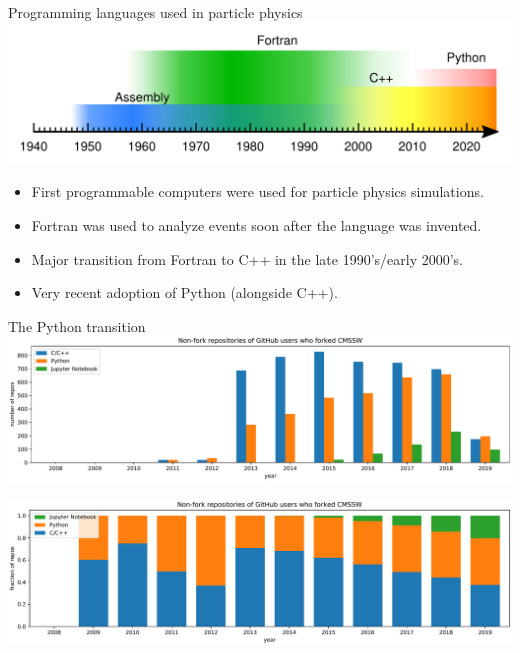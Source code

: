\documentclass[aspectratio=169]{beamer}
\begin{document}
\begin{frame}{Programming languages used in particle physics}
\large
\vspace{0.5 cm}
\includegraphics[width=\linewidth]{programming-languages.pdf}

\vspace{0.25 cm}
\begin{itemize}
\item First programmable computers were used for particle physics simulations.
\item Fortran was used to analyze events soon after the language was invented.
\item Major transition from Fortran to C++ in the late 1990's/early 2000's.
\item Very recent adoption of Python (alongside C++).
\end{itemize}
\end{frame}

\begin{frame}{The Python transition}
\vspace{0.2 cm}
\includegraphics[width=\linewidth]{github-cmssw-lin.pdf}

\includegraphics[width=\linewidth]{github-cmssw-frac.pdf}
\end{frame}
\end{document}
